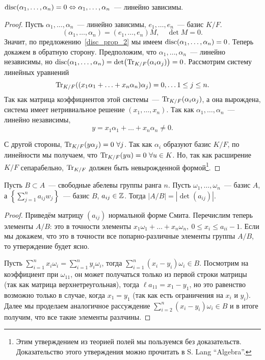 \begin{definition}
		\begin{statement} 
			$\operatorname{disc}(\alpha_1, \ldots, \alpha_n) = 0 \Leftrightarrow \alpha_1, \ldots, \alpha_n$~--- линейно зависимы. 
		\end{statement}
		\begin{proof}
			Пусть $\alpha_1, \ldots, \alpha_n$~--- линейно зависимы, $e_1, \ldots, e_n$~--- базис $K/F$.
			\[
				(\alpha_1, \ldots, \alpha_n) = (e_1, \ldots, e_n)M, \quad \det{M} = 0.
			\]
			Значит, по предложению~\ref{disc_prop_2} мы имеем $\operatorname{disc}(\alpha_1, \ldots, \alpha_n) = 0$. Теперь докажем в обратную сторону. 
			Предположим, что $\alpha_1, \ldots, \alpha_n$~--- линейно независимы, но $\disc(\alpha_1, \ldots, \alpha_n) = \det\lr*{\Tr_{K/F}(\alpha_i \alpha_j)} = 0$. Рассмотрим систему линейных уравнений 
			\[
				\Tr_{K/F}\lr*{(x_1 \alpha_1 + \ldots + x_n \alpha_n)\alpha_j} = 0, \ldots 1 \le j \le n.
			\]
			Так как матрица коэффициентов этой системы~--- $\operatorname{Tr}_{K/F}(\alpha_i \alpha_j)$, а она вырождена, система имеет нетривиальное решение $(x_1, \ldots, x_n)$. Так как $\alpha_1, \ldots, \alpha_n$~--- линейно независимы, 
			\[
				y = x_1 \alpha_1 + \ldots +  x_n \alpha_n \neq 0.
			\]

			С другой стороны, $\operatorname{Tr}_{K/F}(y \alpha_{j}) = 0 \ \forall j$. Так как $\alpha_i$ образуют базис $K/F$, по линейности мы получаем, что $\operatorname{Tr}_{K/F}(y u) = 0 \ \forall u \in K$. Но, так как расширение $K/F$ сепарабельно, $\operatorname{Tr}_{K/F}$ должен быть невырожденной формой\footnote{Этим утверждением из теорией полей мы пользуемся без доказательств. Доказательство этого утверждения можно прочитать в S. Lang ``Algebra''. }.
			

		\end{proof}

		\begin{lemma}\label{free_abelian_groups_prop} 
			Пусть $B \subset A$~--- свободные абелевы группы ранга $n$. Пусть $\omega_1, \ldots, \omega_n$~--- базис $A$, а $\left\{\sum_{j = 1}^{n} a_{i j} w_{j}\right\}$~--- базис $B$, $a_{i j} \in \mathbb{Z}$. Тогда $|A / B| = |\det(a_{i j})|$.
		\end{lemma}
		\begin{proof}
			Приведём матрицу $(a_{i j})$ нормальной форме Смита. Перечислим теперь элементы $A/B$: это в точности элементы $x_1 \omega_1 + \ldots + x_n \omega_n, \ 0 \le x_i \le a_{ii} - 1$. Если мы докажем, что это в точности все попарно-различные элементы группы $A/B$, то утверждение будет ясно. 

			Пусть $\sum_{i = 1}^{n} x_i \omega_i = \sum_{i = 1}^{n} y_i \omega_i$, тогда $\sum_{i = 1}^{n}(x_i - y_i) \omega_i \in B$. Посмотрим на коэффициент при $\omega_{11}$, он может получаться только из первой строки матрицы (так как матрица верхнетреугольная), тогда   $\ell a_{11} = x_{1} - y_{1}$, но это равенство возможно только в случае, когда $x_1 = y_1$ (так как есть ограничения на $x_i$ и $y_i$). Далее мы проделаем аналогичное рассуждение $\sum_{i = 2}^{n} (x_i - y_i) \omega_i \in B$ и в итоге получим, что все такие элементы разлчины. 


\end{proof}
\end{definition}
